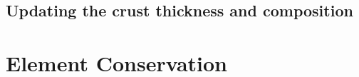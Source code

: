 \documentclass[11pt]{article}
\begin{document}
\subsection{Updating the crust thickness and composition}

\section{Element Conservation}





\end{document}
